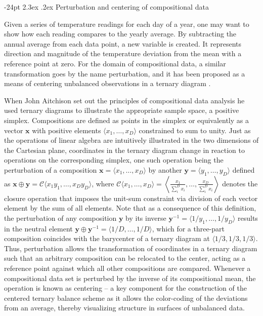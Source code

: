 \documentclass[10pt,twoside,reqno]{article}
\makeatletter
\renewcommand\section{\@startsection {section}{1}{\z@}%
                                   {-24pt}%
                                   {2.3ex \@plus.2ex}%
                                   {\normalfont\large\bfseries}}
\makeatother
\begin{document}
\hypertarget{perturbation-and-centering-of-compositional-data}{%
\section{Perturbation and centering of compositional
data}\label{perturbation-and-centering-of-compositional-data}}

Given a series of temperature readings for each day of a year, one may
want to show how each reading compares to the yearly average. By
subtracting the annual average from each data point, a new variable is
created. It represents direction and magnitude of the temperature
deviation from the mean with a reference point at zero. For the domain
of compositional data, a similar transformation goes by the name
perturbation, and it has been proposed as a means of centering
unbalanced observations in a ternary diagram
\citep{VonEynatten2002, PawlowskyGlahn2002}.

When John Aitchison set out the principles of compositional data
analysis \citep{Aitchison1982, Aitchison1986, PawlowskyGlahn2015} he
used ternary diagrams to illustrate the appropriate sample space, a
positive simplex. Compositions are defined as points in the simplex or
equivalently as a vector \(\mathbf{x}\) with positive elements
\(\langle x_1,\ldots,x_D \rangle\) constrained to sum to unity. Just as
the operations of linear algebra are intuitively illustrated in the two
dimensions of the Cartesian plane, coordinates in the ternary diagram
change in reaction to operations on the corresponding simplex, one such
operation being the perturbation of a composition
\(\mathbf{x}=\langle x_1, \ldots, x_D \rangle\) by another
\(\mathbf{y}=\langle y_1, \ldots, y_D \rangle\) defined as
\(\mathbf{x}\oplus \mathbf{y}=\mathcal{C}\langle x_1y_1, \ldots, x_Dy_D \rangle\),
where
\(\mathcal{C}\langle x_1, \ldots, x_D \rangle = \left\langle\frac{x_1}{\sum_i^D x_i},\ldots, \frac{x_D}{\sum_i^D x_i}\right\rangle\)
denotes the closure operation that imposes the unit-sum constraint via
division of each vector element by the sum of all elements. Note that as
a consequence of this definition, the perturbation of any composition
\(\mathbf{y}\) by its inverse
\(\mathbf{y}^{-1}=\langle 1/y_1, \ldots, 1/y_D \rangle\) results in the
neutral element
\(\mathbf{y}\oplus \mathbf{y}^{-1}=\langle 1/D, \ldots, 1/D \rangle\),
which for a three-part composition coincides with the barycenter of a
ternary diagram at \(\langle 1/3, 1/3, 1/3 \rangle\). Thus, perturbation
allows the transformation of coordinates in a ternary diagram such that
an arbitrary composition can be relocated to the center, acting as a
reference point against which all other compositions are compared.
Whenever a compositional data set is perturbed by the inverse of its
compositional mean, the operation is known as centering -- a key
component for the construction of the centered ternary balance scheme as
it allows the color-coding of the deviations from an average, thereby
visualizing structure in surfaces of unbalanced data.
\end{document}
